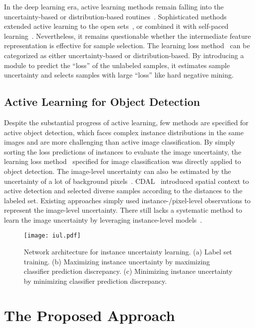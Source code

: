 \documentclass[final]{cvpr}
\begin{document}
In the deep learning era, active learning methods remain falling into the uncertainty-based or distribution-based routines~\cite{SelfPaced18,CostEffective17,PowerEnsem18}. Sophisticated methods extended active learning to the open sets~\cite{OpenSet2019}, or combined it with self-paced learning~\cite{SelfPaced2020}. Nevertheless, it remains questionable whether the intermediate feature representation is effective for sample selection. The learning loss method~\cite{LearningLoss19} can be categorized as either uncertainty-based or distribution-based. By introducing a module to predict the ``loss'' of the unlabeled samples, it estimates sample uncertainty and selects samples with large ``loss'' like hard negative mining.

\subsection{Active Learning for Object Detection}
Despite the substantial progress of active learning, few methods are specified for active object detection, which faces complex instance distributions in the same images and are more challenging than active image classification. By simply sorting the loss predictions of instances to evaluate the image uncertainty, the learning loss method~\cite{LearningLoss19} specified for image classification was directly applied to object detection. The image-level uncertainty can also be estimated by the uncertainty of a lot of background pixels~\cite{PedesDetect19}. CDAL~\cite{CDAL20} introduced spatial context to active detection and selected diverse samples according to the distances to the labeled set. Existing approaches simply used instance-/pixel-level observations to represent the image-level uncertainty. There still lacks a systematic method to learn the image uncertainty by leveraging instance-level models~\cite{FreeAnchor2019,LTM2021}.



\begin{figure*}[t]
    \centering
    \texttt{[image: iul.pdf]}
    \caption{Network architecture for instance uncertainty learning. (a) Label set training. (b) Maximizing instance uncertainty by maximizing classifier prediction discrepancy. (c) Minimizing instance uncertainty by minimizing classifier prediction discrepancy.}
    \label{fig:flowchart-iul}
\end{figure*}

\section{The Proposed Approach}
\end{document}
